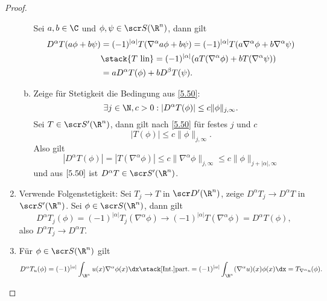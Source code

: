 \begin{st}[Ableitung]
\begin{proof}
\begin{enumerate}[1)]
\begin{enumerate}[a)]
						Sei $a,b\in \C$ und $\phi, \psi \in \scr S(\R^n)$, dann gilt
						\begin{align*}
							D^\alpha T(a \phi + b \psi)
							&= (-1)^{|\alpha|} T(\nabla^{\alpha} a \phi + b \psi)
							= (-1)^{|\alpha|} T(a \nabla^{\alpha} \phi + b \nabla^\alpha \psi) \\
							&\stack{T \text{ lin}}= (-1)^{|\alpha|} (aT(\nabla^{\alpha} \phi) + bT( \nabla^\alpha \psi)) \\
							&= aD^\alpha T(\phi) + b D^\beta T(\psi).
						\end{align*}
					\item
						Zeige für Stetigkeit die Bedingung aus \ref{5.50}:
						\[
							\exists j \in \N, c > 0
							: |D^\alpha T(\phi)| \le c \|\phi\|_{j,\infty}.
						\]
						Sei $T \in \scr S'(\R^n)$, dann gilt nach \ref{5.50} für festes $j$ und $c$
						\[
							|T(\phi)| \le c \|\phi\|_{j,\infty}.
						\]
						Also gilt
						\[
							|D^\alpha T(\phi)|
							= |T(\nabla^\alpha \phi)|
							\le c \|\nabla^\alpha \phi\|_{j,\infty}
							\le c \|\phi\|_{j+|\alpha|,\infty}
						\]
						und aus $\ref{5.50}$ ist $D^\alpha T \in \scr S'(\R^n)$.
				\end{enumerate}
			\item
				Verwende Folgenstetigkeit:
				Sei $T_j \to T$ in $\scr D'(\R^n)$, zeige $D^\alpha T_j \to D^\alpha T$ in $\scr S'(\R^n)$.
				Sei $\phi \in \scr S(\R^n)$, dann gilt
				\[
					D^\alpha T_j(\phi)
					= (-1)^{|\alpha|} T_j(\nabla^\alpha \phi)
					\to (-1)^{|\alpha|} T(\nabla^\alpha \phi)
					= D^\alpha T(\phi),
				\]
				also $D^\alpha T_j \to D^\alpha T$.
			\item
				Für $\phi \in \scr S(\R^n)$ gilt
				\[
					D^\alpha T_u(\phi)
					= (-1)^{|\alpha|} \int_{\R^n} u(x) \nabla^\alpha \phi(x) \dx
					\stack[\text{Int.}]{\text{part.}}= (-1)^{|\alpha|} \int_{\R^n} (\nabla^\alpha u)(x) \phi(x) \dx
					= T_{\nabla^\alpha u}(\phi).
				\]
		\end{enumerate}
	\end{proof}
\end{st}

